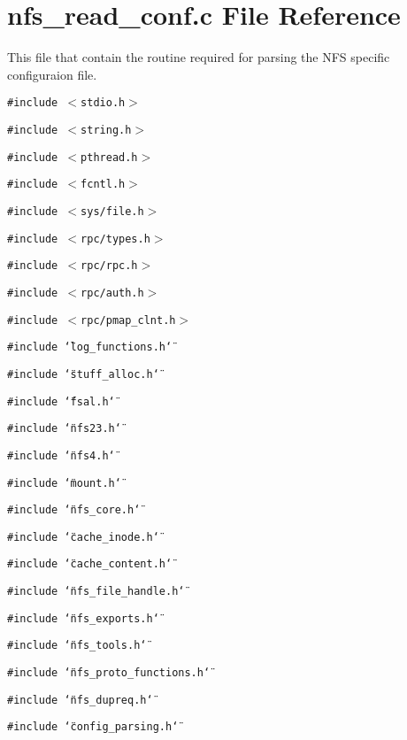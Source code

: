 \section{nfs\_\-read\_\-conf.c File Reference}
\label{nfs__read__conf_8c}
This file that contain the routine required for parsing the NFS specific configuraion file. 

{\tt \#include $<$stdio.h$>$}\par
{\tt \#include $<$string.h$>$}\par
{\tt \#include $<$pthread.h$>$}\par
{\tt \#include $<$fcntl.h$>$}\par
{\tt \#include $<$sys/file.h$>$}\par
{\tt \#include $<$rpc/types.h$>$}\par
{\tt \#include $<$rpc/rpc.h$>$}\par
{\tt \#include $<$rpc/auth.h$>$}\par
{\tt \#include $<$rpc/pmap\_\-clnt.h$>$}\par
{\tt \#include \char`\"{}log\_\-functions.h\char`\"{}}\par
{\tt \#include \char`\"{}stuff\_\-alloc.h\char`\"{}}\par
{\tt \#include \char`\"{}fsal.h\char`\"{}}\par
{\tt \#include \char`\"{}nfs23.h\char`\"{}}\par
{\tt \#include \char`\"{}nfs4.h\char`\"{}}\par
{\tt \#include \char`\"{}mount.h\char`\"{}}\par
{\tt \#include \char`\"{}nfs\_\-core.h\char`\"{}}\par
{\tt \#include \char`\"{}cache\_\-inode.h\char`\"{}}\par
{\tt \#include \char`\"{}cache\_\-content.h\char`\"{}}\par
{\tt \#include \char`\"{}nfs\_\-file\_\-handle.h\char`\"{}}\par
{\tt \#include \char`\"{}nfs\_\-exports.h\char`\"{}}\par
{\tt \#include \char`\"{}nfs\_\-tools.h\char`\"{}}\par
{\tt \#include \char`\"{}nfs\_\-proto\_\-functions.h\char`\"{}}\par
{\tt \#include \char`\"{}nfs\_\-dupreq.h\char`\"{}}\par
{\tt \#include \char`\"{}config\_\-parsing.h\char`\"{}}\par
